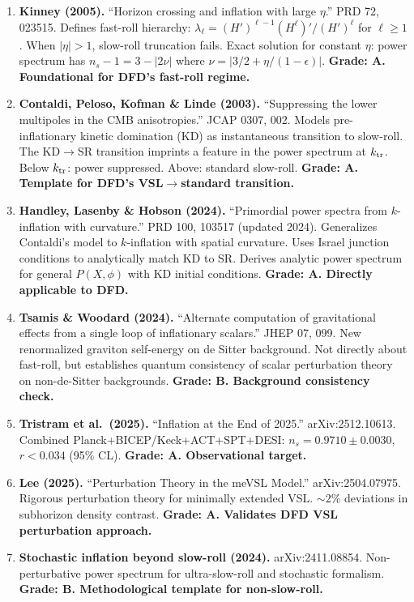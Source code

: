 \documentclass[11pt,a4paper]{article}
\begin{document}
\begin{enumerate}
\item \textbf{Kinney (2005).} ``Horizon crossing and inflation with large $\eta$.'' PRD 72, 023515. Defines fast-roll hierarchy: $\lambda_\ell = (H')^{\ell-1}(H^{\ell})'/(H')^\ell$ for $\ell \geq 1$. When $|\eta| > 1$, slow-roll truncation fails. Exact solution for constant $\eta$: power spectrum has $n_s - 1 = 3 - |2\nu|$ where $\nu = |3/2 + \eta/(1-\epsilon)|$. \textbf{Grade: A. Foundational for DFD's fast-roll regime.}

\item \textbf{Contaldi, Peloso, Kofman \& Linde (2003).} ``Suppressing the lower multipoles in the CMB anisotropies.'' JCAP 0307, 002. Models pre-inflationary kinetic domination (KD) as instantaneous transition to slow-roll. The KD$\to$SR transition imprints a feature in the power spectrum at $k_{\rm tr}$. Below $k_{\rm tr}$: power suppressed. Above: standard slow-roll. \textbf{Grade: A. Template for DFD's VSL$\to$standard transition.}

\item \textbf{Handley, Lasenby \& Hobson (2024).} ``Primordial power spectra from $k$-inflation with curvature.'' PRD 100, 103517 (updated 2024). Generalizes Contaldi's model to $k$-inflation with spatial curvature. Uses Israel junction conditions to analytically match KD to SR. Derives analytic power spectrum for general $P(X,\phi)$ with KD initial conditions. \textbf{Grade: A. Directly applicable to DFD.}

\item \textbf{Tsamis \& Woodard (2024).} ``Alternate computation of gravitational effects from a single loop of inflationary scalars.'' JHEP 07, 099. New renormalized graviton self-energy on de Sitter background. Not directly about fast-roll, but establishes quantum consistency of scalar perturbation theory on non-de-Sitter backgrounds. \textbf{Grade: B. Background consistency check.}

\item \textbf{Tristram et al.\ (2025).} ``Inflation at the End of 2025.'' arXiv:2512.10613. Combined Planck+BICEP/Keck+ACT+SPT+DESI: $n_s = 0.9710 \pm 0.0030$, $r < 0.034$ (95\% CL). \textbf{Grade: A. Observational target.}

\item \textbf{Lee (2025).} ``Perturbation Theory in the meVSL Model.'' arXiv:2504.07975. Rigorous perturbation theory for minimally extended VSL. $\sim 2\%$ deviations in subhorizon density contrast. \textbf{Grade: A. Validates DFD VSL perturbation approach.}

\item \textbf{Stochastic inflation beyond slow-roll (2024).} arXiv:2411.08854. Non-perturbative power spectrum for ultra-slow-roll and stochastic formalism. \textbf{Grade: B. Methodological template for non-slow-roll.}
\end{enumerate}
\end{document}
